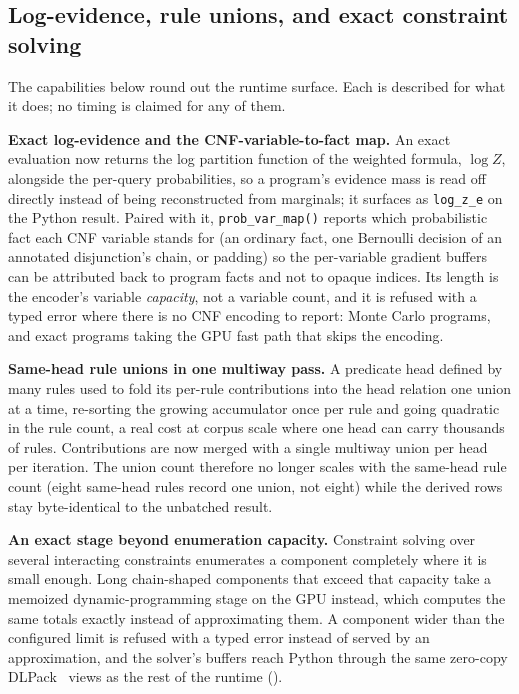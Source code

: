 \subsection{Log-evidence, rule unions, and exact constraint solving}\label{sec:noquant}

The capabilities below round out the runtime surface. Each is described for what it does; no timing is claimed for any of them.

\textbf{Exact log-evidence and the CNF-variable-to-fact map.} An exact evaluation now returns the log partition function of the weighted formula, $\log Z$, alongside the per-query probabilities, so a program's evidence mass is read off directly instead of being reconstructed from marginals; it surfaces as \texttt{log\_z\_e} on the Python result. Paired with it, \texttt{prob\_var\_map()} reports which probabilistic fact each CNF variable stands for (an ordinary fact, one Bernoulli decision of an annotated disjunction's chain, or padding) so the per-variable gradient buffers can be attributed back to program facts and not to opaque indices. Its length is the encoder's variable \emph{capacity}, not a variable count, and it is refused with a typed error where there is no CNF encoding to report: Monte Carlo programs, and exact programs taking the GPU fast path that skips the encoding.

\textbf{Same-head rule unions in one multiway pass.} A predicate head defined by many rules used to fold its per-rule contributions into the head relation one union at a time, re-sorting the growing accumulator once per rule and going quadratic in the rule count, a real cost at corpus scale where one head can carry thousands of rules. Contributions are now merged with a single multiway union per head per iteration. The union count therefore no longer scales with the same-head rule count (eight same-head rules record one union, not eight) while the derived rows stay byte-identical to the unbatched result.

\textbf{An exact stage beyond enumeration capacity.} Constraint solving over several interacting constraints enumerates a component completely where it is small enough. Long chain-shaped components that exceed that capacity take a memoized dynamic-programming stage on the GPU instead, which computes the same totals exactly instead of approximating them. A component wider than the configured limit is refused with a typed error instead of served by an approximation, and the solver's buffers reach Python through the same zero-copy DLPack~\cite{dlpack} views as the rest of the runtime ().
